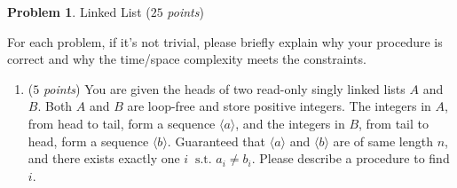 \documentclass[12pt,a4paper]{report}
\newcommand{\points}[1]{ ($#1$ \textit{points}) }
\theoremstyle{definition}
\newtheorem{problem}{\textbf{Problem}}
\theoremstyle{definition}
\begin{document}
\newpage

\begin{problem} Linked List \points{25}

For each problem, if it's not trivial, please briefly explain why your procedure is correct and why the time/space complexity meets the constraints.

\begin{enumerate}[label=\arabic*.]
\item \points{5}You are given the heads of two read-only singly linked lists $A$ and $B$. Both $A$ and $B$ are loop-free and store positive integers. The integers in $A$, from head to tail, form a sequence $\langle a \rangle$, and the integers in $B$, from tail to head, form a sequence $\langle b \rangle$. Guaranteed that $\langle a\rangle$ and $\langle b\rangle$ are of same length $n$, and there exists exactly one $i\ \text{ s.t. } a_i \neq b_i$. Please describe a procedure to find $i$.\\


\end{enumerate}
\end{problem}
\end{document}

